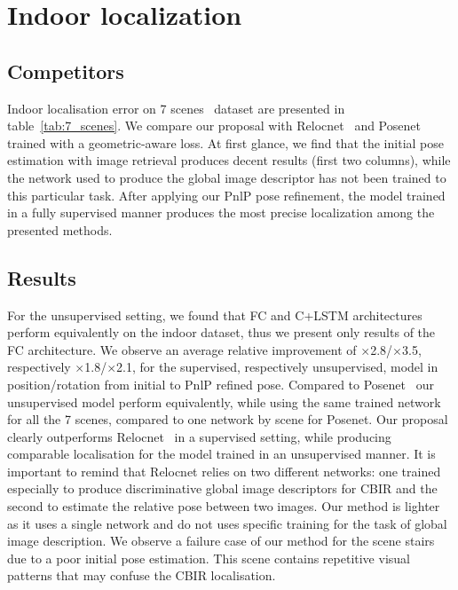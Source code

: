 \section{Indoor localization}
\label{sec:indoor}

\subsection{Competitors}
Indoor localisation error on 7 scenes~\citep{Shotton2013} dataset are presented in table~\ref{tab:7_scenes}. We compare our proposal with Relocnet~\citep{Purkait2018} and Posenet~\citep{Kendall2017} trained with a geometric-aware loss. At first glance, we find that the initial pose estimation with image retrieval produces decent results (first two columns), while the network used to produce the global image descriptor has not been trained to this particular task. After applying our PnlP pose refinement, the model trained in a fully supervised manner produces the most precise localization among the presented methods. 

\subsection{Results}


For the unsupervised setting, we found that FC and C+LSTM architectures perform equivalently on the indoor dataset, thus we present only results of the FC architecture. We observe an average relative improvement of $\times$2.8/$\times$3.5, respectively $\times$1.8/$\times$2.1, for the supervised, respectively unsupervised, model in position/rotation from initial to PnlP refined pose. Compared to Posenet~\citep{Kendall2017} our unsupervised model perform equivalently, while using the same trained network for all the 7 scenes, compared to one network by scene for Posenet. Our proposal clearly outperforms Relocnet~\citep{Balntas2018} in a supervised setting, while producing comparable localisation for the model trained in an unsupervised manner. It is important to remind that Relocnet relies on two different networks: one trained especially to produce discriminative global image descriptors for CBIR and the second to estimate the relative pose between two images. Our method is lighter as it uses a single network and do not uses specific training for the task of global image description. We observe a failure case of our method for the scene stairs due to a poor initial pose estimation. This scene contains repetitive visual patterns that may confuse the CBIR localisation.

